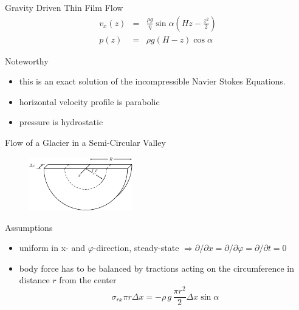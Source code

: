 \documentclass[hide notes,intlimits,unknownkeysallowed]{beamer}
\begin{document}
\begin{frame}{Gravity Driven Thin Film Flow}
\begin{equation*}
    \begin{array}{ccl}
      v_x (z) &  = & \frac{\rho g}{\eta} \sin{\alpha}\left(Hz - \frac{z^2}{2}\right) \\[1em]
      p(z) & = & \rho g \left(H - z\right)\cos{\alpha}
    \end{array}
  \end{equation*}
\begin{block}{Noteworthy}
\begin{itemize}
\item this is an \alert{exact} solution of the incompressible Navier Stokes Equations.
\item horizontal velocity profile is \alert{parabolic}
\item pressure is \alert{hydrostatic}
\end{itemize}
\end{block}
\end{frame}

\begin{frame}{Flow of a Glacier in a Semi-Circular Valley}
  \vspace{-1em}
  \begin{figure}
    \centering
    \includegraphics[width=0.4\textwidth]{fig_channel}
    \label{fig:valley-glacier-coord}
  \end{figure}
  \begin{block}{Assumptions}
    \begin{itemize}
    \item uniform in x- and $\varphi$-direction, steady-state $\Rightarrow \partial / \partial x = \partial / \partial \varphi = \partial / \partial t = 0$
    \item body force has to be balanced by tractions acting on the circumference in distance $r$ from the center
      \begin{equation*}
        \sigma_{rx} \pi r \Delta x = - \rho\,g\,\frac{\pi r^2}{2} \Delta x \sin \alpha
      \end{equation*}
\end{itemize}
  \end{block}
\end{frame}
\end{document}
